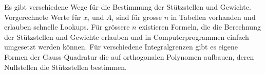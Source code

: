 Es gibt verschiedene Wege für die Bestimmung der Stützstellen und Gewichte.
Vorgerechnete Werte für $x_{i}$ und $A_{i}$ sind für grosse $n$ in Tabellen
vorhanden und erlauben schnelle Lookups. Für grössere $n$ existieren
Formeln, die die Berechnung der Stützstellen und Gewichte erlauben und
in Computerprogrammen einfach umgesetzt werden können.
Für verschiedene Integralgrenzen gibt es eigene Formen der Gauss-Quadratur
die auf orthogonalen Polynomen aufbauen, deren Nullstellen die Stützstellen
bestimmen.







